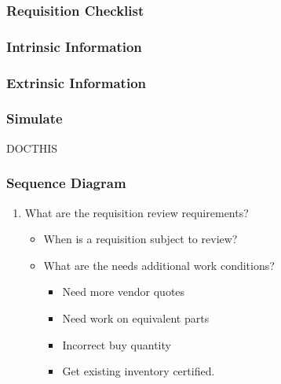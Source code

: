 \documentclass[letterpaper,10pt,english]{sphinxmanual}
\begin{document}
\subsubsection{Requisition Checklist}
\label{\detokenize{750-Requisitions:requisition-checklist}}

\subsubsection{Intrinsic Information}
\label{\detokenize{750-Requisitions:intrinsic-information}}

\subsubsection{Extrinsic Information}
\label{\detokenize{750-Requisitions:extrinsic-information}}

\subsubsection{Simulate}
\label{\detokenize{750-Requisitions:simulate}}
DOCTHIS


\subsubsection{Sequence Diagram}
\label{\detokenize{750-Requisitions:sequence-diagram}}
\noindent{}
\begin{enumerate}
%
\item {} 
What are the requisition review requirements?
\begin{itemize}
\item {} 
When is a requisition subject to review?

\item {} 
What are the needs additional work conditions?
\begin{itemize}
\item {} 
Need more vendor quotes

\item {} 
Need work on equivalent parts

\item {} 
Incorrect buy quantity

\item {} 
Get existing inventory certified.

\end{itemize}

\end{itemize}

\end{enumerate}
\end{document}
